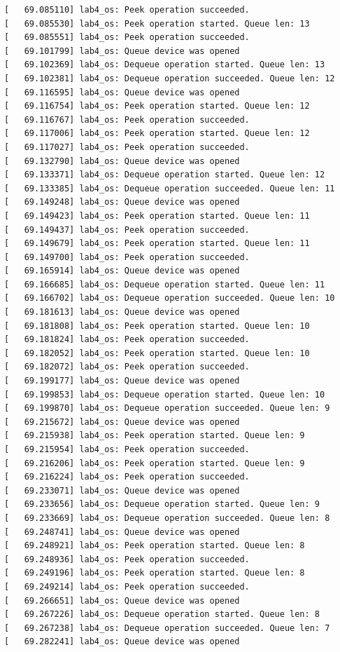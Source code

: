 \documentclass[a4paper,14pt]{extarticle}
\begin{document}
\begin{verbatim}
[   69.085110] lab4_os: Peek operation succeeded.
[   69.085530] lab4_os: Peek operation started. Queue len: 13
[   69.085551] lab4_os: Peek operation succeeded.
[   69.101799] lab4_os: Queue device was opened
[   69.102369] lab4_os: Dequeue operation started. Queue len: 13
[   69.102381] lab4_os: Dequeue operation succeeded. Queue len: 12
[   69.116595] lab4_os: Queue device was opened
[   69.116754] lab4_os: Peek operation started. Queue len: 12
[   69.116767] lab4_os: Peek operation succeeded.
[   69.117006] lab4_os: Peek operation started. Queue len: 12
[   69.117027] lab4_os: Peek operation succeeded.
[   69.132790] lab4_os: Queue device was opened
[   69.133371] lab4_os: Dequeue operation started. Queue len: 12
[   69.133385] lab4_os: Dequeue operation succeeded. Queue len: 11
[   69.149248] lab4_os: Queue device was opened
[   69.149423] lab4_os: Peek operation started. Queue len: 11
[   69.149437] lab4_os: Peek operation succeeded.
[   69.149679] lab4_os: Peek operation started. Queue len: 11
[   69.149700] lab4_os: Peek operation succeeded.
[   69.165914] lab4_os: Queue device was opened
[   69.166685] lab4_os: Dequeue operation started. Queue len: 11
[   69.166702] lab4_os: Dequeue operation succeeded. Queue len: 10
[   69.181613] lab4_os: Queue device was opened
[   69.181808] lab4_os: Peek operation started. Queue len: 10
[   69.181824] lab4_os: Peek operation succeeded.
[   69.182052] lab4_os: Peek operation started. Queue len: 10
[   69.182072] lab4_os: Peek operation succeeded.
[   69.199177] lab4_os: Queue device was opened
[   69.199853] lab4_os: Dequeue operation started. Queue len: 10
[   69.199870] lab4_os: Dequeue operation succeeded. Queue len: 9
[   69.215672] lab4_os: Queue device was opened
[   69.215938] lab4_os: Peek operation started. Queue len: 9
[   69.215954] lab4_os: Peek operation succeeded.
[   69.216206] lab4_os: Peek operation started. Queue len: 9
[   69.216224] lab4_os: Peek operation succeeded.
[   69.233071] lab4_os: Queue device was opened
[   69.233656] lab4_os: Dequeue operation started. Queue len: 9
[   69.233669] lab4_os: Dequeue operation succeeded. Queue len: 8
[   69.248741] lab4_os: Queue device was opened
[   69.248921] lab4_os: Peek operation started. Queue len: 8
[   69.248936] lab4_os: Peek operation succeeded.
[   69.249196] lab4_os: Peek operation started. Queue len: 8
[   69.249214] lab4_os: Peek operation succeeded.
[   69.266651] lab4_os: Queue device was opened
[   69.267226] lab4_os: Dequeue operation started. Queue len: 8
[   69.267238] lab4_os: Dequeue operation succeeded. Queue len: 7
[   69.282241] lab4_os: Queue device was opened

\end{verbatim}
\end{document}
